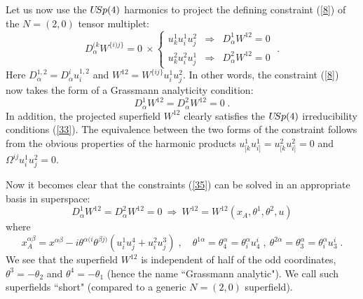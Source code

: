 \documentclass[a4paper,12pt]{article}
\begin{document}
Let us now use the $U\hskip-2pt Sp(4)$ harmonics to project the 
defining constraint (\ref{8}) of the $N=(2,0)$ tensor multiplet: 
\begin{equation}\label{34}
   D^{(k}_\alpha W^{\{i)j\}}=0 \ \times 
 \left\{\begin{array}{lll}
    u^1_k u^1_i u^2_j & \Rightarrow & D^1_\alpha W^{12} =0 \\
     u^2_k u^2_i u^1_j & \Rightarrow & D^2_\alpha W^{12} =0
  \end{array}
 \right.\;.
\end{equation}
Here $D^{1,2}_\alpha = D^i_\alpha u^{1,2}_i$ and 
$W^{12}=W^{\{ij\}}u^1_i u^2_j$. In other words, the constraint 
(\ref{8}) now takes the form of a Grassmann analyticity condition:
\begin{equation}\label{35}
D^1_\alpha W^{12} = D^2_\alpha W^{12} =0\;. 
\end{equation}
In addition, the projected superfield $W^{12}$ clearly satisfies 
the $U\hskip-2pt Sp(4)$ irreducibility conditions (\ref{33}). The 
equivalence between the two forms of the constraint follows from 
the obvious properties of the harmonic products $u^1_{[k} u^1_{i]} 
= u^2_{[k} u^2_{i]}=0$ and $\Omega^{ij}u^1_iu^2_j=0$. 

Now it becomes clear that the constraints (\ref{35}) can be solved 
in an appropriate basis in superspace: 
\begin{equation}\label{36}
 D^1_\alpha W^{12} = D^2_\alpha W^{12} =0 \ \Rightarrow \ 
W^{12} = W^{12}(x_A,\theta^1,\theta^2,u)
\end{equation}
where
\begin{equation}\label{37}
  x^{\alpha\beta}_A = x^{\alpha\beta} - 
i\theta^{\alpha(i}\theta^{\beta j)} (u^1_iu^4_j + u^2_iu^3_j)\;, 
\quad \theta^{1\alpha} = \theta^\alpha_4 = \theta^{\alpha}_i 
u^i_4\;, \ \theta^{2\alpha} = \theta^\alpha_3 = \theta^{\alpha}_i 
u^i_3\;. 
\end{equation}
We see that the superfield $W^{12}$ is independent of half of the 
odd coordinates, $\theta^3=-\theta_2$ and $\theta^4=-\theta_1$ 
(hence the name ``Grassmann analytic"). We call such superfields 
``short" (compared to a generic $N=(2,0)$ superfield).
\end{document}
